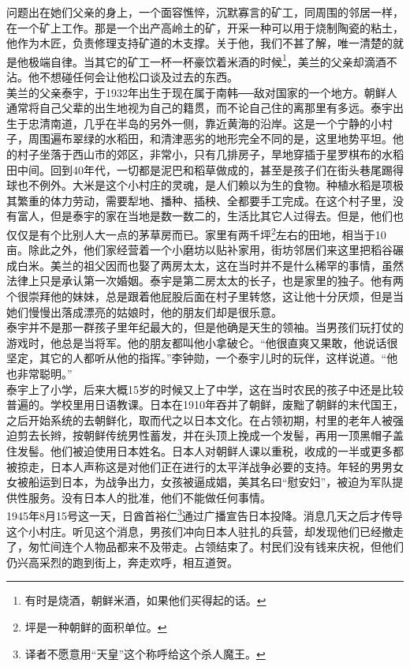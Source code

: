 问题出在她们父亲的身上，一个面容憔悴，沉默寡言的矿工，同周围的邻居一样，在一个矿上工作。那是一个出产高岭土的矿，开采一种可以用于烧制陶瓷的粘土，他作为木匠，负责修理支持矿道的木支撑。关于他，我们不甚了解，唯一清楚的就是他极端自律。当其它的矿工一杯一杯豪饮着米酒的时候\footnote{有时是烧酒，朝鲜米酒，如果他们买得起的话。}，美兰的父亲却滴酒不沾。他不想碰任何会让他松口谈及过去的东西。\\

美兰的父亲泰宇，于1932年出生于现在属于南韩──敌对国家的一个地方。朝鲜人通常将自己父辈的出生地视为自己的籍贯，而不论自己住的离那里有多远。泰宇出生于忠清南道，几乎在半岛的另外一侧，靠近黄海的沿岸。这是一个宁静的小村子，周围遍布翠绿的水稻田，和清津恶劣的地形完全不同的是，这里地势平坦。他的村子坐落于西山市的郊区，非常小，只有几排房子，旱地穿插于星罗棋布的水稻田中间。回到40年代，一切都是泥巴和稻草做成的，甚至是孩子们在街头巷尾踢得球也不例外。大米是这个小村庄的灵魂，是人们赖以为生的食物。种植水稻是项极其繁重的体力劳动，需要犁地、播种、插秧、全都要手工完成。在这个村子里，没有富人，但是泰宇的家在当地是数一数二的，生活比其它人过得去。但是，他们也仅仅是有个比别人大一点的茅草房而已。家里有两千坪\footnote{坪是一种朝鲜的面积单位。}左右的田地，相当于10亩。除此之外，他们家经营着一个小磨坊以贴补家用，街坊邻居们来这里把稻谷碾成白米。美兰的祖父因而也娶了两房太太，这在当时并不是什么稀罕的事情，虽然法律上只是承认第一次婚姻。泰宇是第二房太太的长子，也是家里的独子。他有两个很崇拜他的妹妹，总是跟着他屁股后面在村子里转悠，这让他十分厌烦，但是当她们慢慢出落成漂亮的姑娘时，他的朋友们却是很乐意。\\

泰宇并不是那一群孩子里年纪最大的，但是他确是天生的领袖。当男孩们玩打仗的游戏时，他总是当将军。他的朋友都叫他小拿破仑。“他很直爽又果敢，他说话很坚定，其它的人都听从他的指挥。”李钟勋，一个泰宇儿时的玩伴，这样说道。“他也非常聪明。”\\

泰宇上了小学，后来大概15岁的时候又上了中学，这在当时农民的孩子中还是比较普遍的。学校里用日语教课。日本在1910年吞并了朝鲜，废黜了朝鲜的末代国王，之后开始系统的去朝鲜化，取而代之以日本文化。在占领初期，村里的老年人被强迫剪去长辫，按朝鲜传统男性蓄发，并在头顶上挽成一个发髻，再用一顶黑帽子盖住发髻。他们被迫使用日本姓名。日本人对朝鲜人课以重税，收成的一半或更多都被掠走，日本人声称这是对他们正在进行的太平洋战争必要的支持。年轻的男男女女被船运到日本，为战争出力，女孩被逼成娼，美其名曰“慰安妇”，被迫为军队提供性服务。没有日本人的批准，他们不能做任何事情。\\

1945年8月15号这一天，日酋首裕仁\footnote{译者不愿意用“天皇”这个称呼给这个杀人魔王。}通过广播宣告日本投降。消息几天之后才传导这个小村庄。听见这个消息，男孩们冲向日本人驻扎的兵营，却发现他们已经撤走了，匆忙间连个人物品都来不及带走。占领结束了。村民们没有钱来庆祝，但他们仍兴高采烈的跑到街上，奔走欢呼，相互道贺。\\

